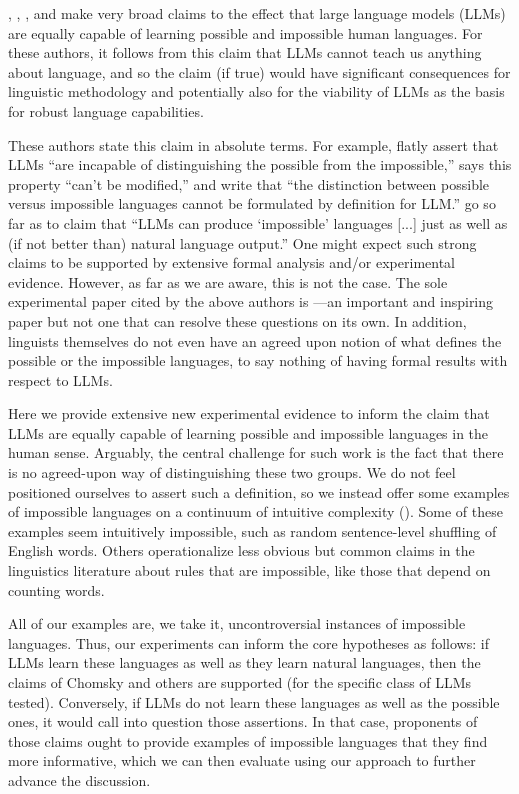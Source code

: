 \documentclass[11pt]{article}
\begin{document}
\citet{chomsky2023cowen}, \citet{chomsky2023nyt}, \citet{moro2023impossible}, and \citet{Bolhuis2024} make very broad claims to the effect that large language models (LLMs) are equally capable of learning possible and impossible human languages. For these authors, it follows from this claim that LLMs cannot teach us anything about language, and so the claim (if true) would have significant consequences for linguistic methodology and potentially also for the viability of LLMs as the basis for robust language capabilities.

These authors state this claim in absolute terms. For example, \citet{chomsky2023nyt} flatly assert that LLMs ``are incapable of distinguishing the possible from the impossible,'' \citet{chomsky2023cowen} says this property ``can't be modified,'' and \citet{moro2023impossible} write that ``the distinction between possible versus impossible languages cannot be formulated by definition for LLM.'' \citet{Bolhuis2024} go so far as to claim that ``LLMs can produce ‘impossible’ languages [...] just as well as (if not better than) natural language output.''
One might expect such strong claims to be supported by extensive formal analysis and/or experimental evidence. However, as far as we are aware, this is not the case. The sole experimental paper cited by the above authors is  \citealt{mitchell-bowers-2020-priorless}---an important and inspiring paper but not one that can resolve these questions on its own. In addition, linguists themselves do not even have an agreed upon notion of what defines the possible or the impossible languages, to say nothing of having formal results with respect to LLMs.

Here we provide extensive new experimental evidence to inform the claim that LLMs are equally capable of learning possible and impossible languages in the human sense. Arguably, the central challenge for such work is the fact that there is no agreed-upon way of distinguishing these two groups. We do not feel positioned ourselves to assert such a definition, so we instead offer some examples of impossible languages on a continuum of intuitive complexity (). 
Some of these examples seem intuitively impossible, such as random sentence-level shuffling of English words. Others operationalize less obvious but common claims in the linguistics literature about rules that are impossible, like those that depend on counting words. 

All of our examples are, we take it, uncontroversial instances of impossible languages. Thus, our experiments can inform the core hypotheses as follows: if LLMs learn these languages as well as they learn natural languages, then the claims of Chomsky and others are supported (for the specific class of LLMs tested). Conversely, if LLMs do not learn these languages as well as the possible ones, it would call into question those assertions. In that case, proponents of those claims ought to provide examples of impossible languages that they find more informative, which we can then evaluate using our approach to further advance the discussion.
\end{document}
